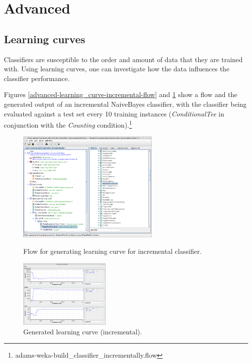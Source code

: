 \newpage
\section{Advanced}

\subsection{Learning curves}
Classifiers are susceptible to the order and amount of data that they are
trained with. Using learning curves, one can investigate how the data
influences the classifier performance.

Figures \ref{advanced-learning_curve-incremental-flow} and \ref{advanced-learning_curve-incremental-output}
show a flow and the generated output of an incremental NaiveBayes classifier, 
with the classifier being evaluated against a test set every 10 training 
instances (\textit{ConditionalTee} in conjunction with the \textit{Counting}
condition).\footnote{adams-weka-build\_classifier\_incrementally.flow}

\begin{figure}[ht]
  \begin{minipage}[t]{0.55\linewidth}
    \centering
    \includegraphics[width=7.0cm]{images/advanced-learning_curve-incremental-flow.png}
    \caption{Flow for generating learning curve for incremental classifier.}
    \label{advanced-learning_curve-incremental-flow}
  \end{minipage}
  \hspace{0.5cm}
  \begin{minipage}[t]{0.45\linewidth}
    \centering
    \includegraphics[width=4.5cm]{images/advanced-learning_curve-incremental-output.png}
    \caption{Generated learning curve (incremental).}
    \label{advanced-learning_curve-incremental-output}
  \end{minipage}
\end{figure}

